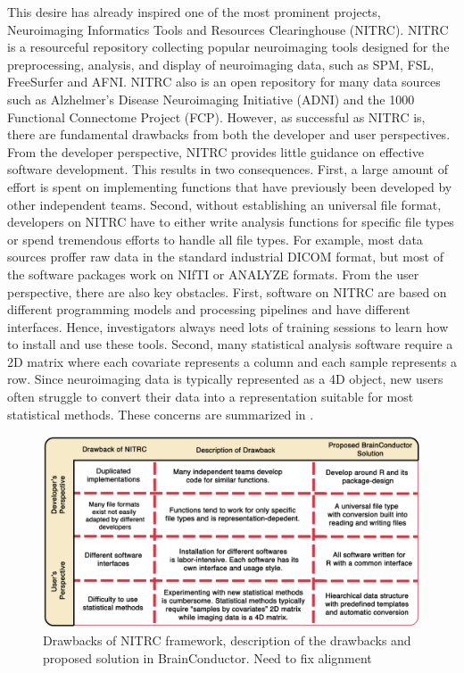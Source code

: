 \documentclass{nature}
\begin{document}
This desire has already  %
inspired one of the most prominent projects, Neuroimaging
Informatics Tools and Resources Clearinghouse (NITRC).
NITRC is a resourceful repository collecting popular neuroimaging tools
designed for the preprocessing,
analysis, and display of neuroimaging data, such as
SPM\cite{penny2011statistical}, FSL\cite{jenkinson2012fsl},
FreeSurfer\cite{fischl2012freesurfer} and AFNI\cite{cox1996afni}. NITRC also is
an open repository for many
data sources such as
Alzhelmer's Disease Neuroimaging Initiative (ADNI) and the
1000 Functional Connectome Project (FCP).
However, as successful as NITRC is, there are fundamental
drawbacks from both the developer and user perspectives.
From the developer perspective,
NITRC provides little guidance on effective software
development.
This results in two consequences. First, a large amount of
effort is spent on implementing functions that have
previously been developed by other independent teams. Second,
without establishing an universal file format,
developers on NITRC have to either
write analysis functions for specific file types or spend tremendous
efforts to handle all file types.
For example,
most data sources proffer raw data in the standard industrial DICOM
format, but most of the software packages work on NIfTI or ANALYZE formats.
From the user perspective, there are also key obstacles.
First, software on NITRC are based on different programming models and
processing pipelines and have different interfaces.
Hence, investigators always need lots of training sessions to
learn how to install and use these tools. Second, many statistical
analysis software require a 2D matrix where each covariate
represents a column and each sample represents a row. Since neuroimaging
data is typically represented as a 4D object, new users often
struggle to convert their data into a representation suitable for
most statistical methods. These concerns are summarized in .

\begin{figure}[tb]
\centering
\includegraphics[width=400pt]{fig/brainconductor/brainconductor_nitrc_chart_v2.png}
\caption{Drawbacks of NITRC framework, description of the drawbacks and proposed
solution
in BrainConductor. {\color{red}Need to fix alignment}}
\label{fig:nitrc}
\end{figure}
\end{document}
